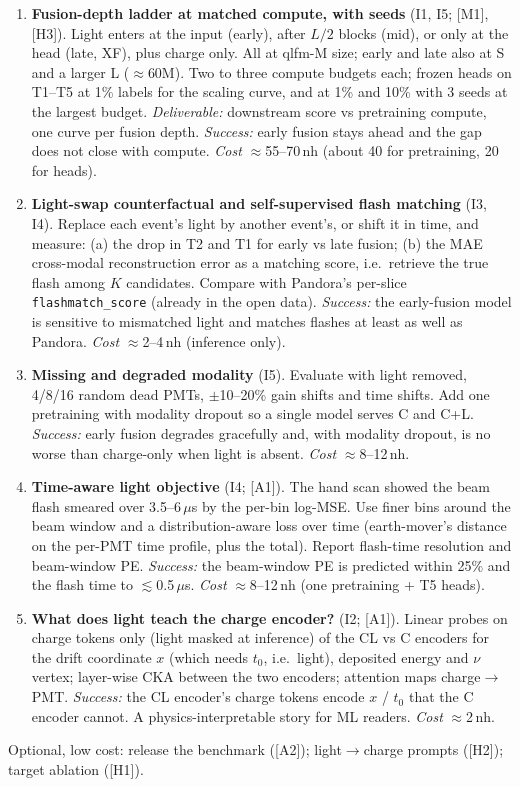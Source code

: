 \documentclass[11pt,a4paper]{article}
\newcommand{\code}[1]{\texttt{\small #1}}
\begin{document}
\begin{enumerate}[label=\textbf{E\arabic*.},leftmargin=*]
  \item \textbf{Fusion-depth ladder at matched compute, with seeds} (I1, I5; [M1], [H3]). Light enters at the input (early), after $L/2$ blocks (mid), or only at the head (late, XF), plus charge only. All at qlfm-M size; early and late also at S and a larger L ($\approx$60M). Two to three compute budgets each; frozen heads on T1--T5 at 1\% labels for the scaling curve, and at 1\% and 10\% with 3 seeds at the largest budget. \emph{Deliverable:} downstream score vs pretraining compute, one curve per fusion depth. \emph{Success:} early fusion stays ahead and the gap does not close with compute. \emph{Cost} $\approx$55--70\,nh (about 40 for pretraining, 20 for heads).
  \item \textbf{Light-swap counterfactual and self-supervised flash matching} (I3, I4). Replace each event's light by another event's, or shift it in time, and measure: (a) the drop in T2 and T1 for early vs late fusion; (b) the MAE cross-modal reconstruction error as a matching score, i.e.\ retrieve the true flash among $K$ candidates. Compare with Pandora's per-slice \code{flashmatch\_score} (already in the open data). \emph{Success:} the early-fusion model is sensitive to mismatched light and matches flashes at least as well as Pandora. \emph{Cost} $\approx$2--4\,nh (inference only).
  \item \textbf{Missing and degraded modality} (I5). Evaluate with light removed, 4/8/16 random dead PMTs, $\pm$10--20\% gain shifts and time shifts. Add one pretraining with modality dropout so a single model serves C and C+L. \emph{Success:} early fusion degrades gracefully and, with modality dropout, is no worse than charge-only when light is absent. \emph{Cost} $\approx$8--12\,nh.
  \item \textbf{Time-aware light objective} (I4; [A1]). The hand scan showed the beam flash smeared over 3.5--6\,$\mu$s by the per-bin log-MSE. Use finer bins around the beam window and a distribution-aware loss over time (earth-mover's distance on the per-PMT time profile, plus the total). Report flash-time resolution and beam-window PE. \emph{Success:} the beam-window PE is predicted within 25\% and the flash time to $\lesssim$0.5\,$\mu$s. \emph{Cost} $\approx$8--12\,nh (one pretraining + T5 heads).
  \item \textbf{What does light teach the charge encoder?} (I2; [A1]). Linear probes on charge tokens only (light masked at inference) of the CL vs C encoders for the drift coordinate $x$ (which needs $t_0$, i.e.\ light), deposited energy and $\nu$ vertex; layer-wise CKA between the two encoders; attention maps charge$\to$PMT. \emph{Success:} the CL encoder's charge tokens encode $x$ / $t_0$ that the C encoder cannot. A physics-interpretable story for ML readers. \emph{Cost} $\approx$2\,nh.
\end{enumerate}
Optional, low cost: release the benchmark ([A2]); light$\to$charge prompts ([H2]); target ablation ([H1]).
\end{document}
